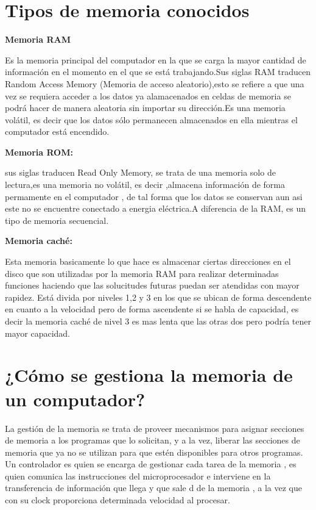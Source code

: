 \documentclass{article}
\begin{document}
\section{Tipos de memoria conocidos} \label{contenido}
\textbf{Memoria RAM}

Es la memoria principal del computador en la que se carga la mayor cantidad de información en el momento en el que se está trabajando.Sus siglas RAM traducen Random Access
Memory (Memoria de acceso aleatorio),esto se refiere a que una vez se requiera acceder a los datos ya alamacenados en celdas de memoria se podrá hacer de manera aleatoria 
sin importar su dirección.Es una memoria volátil, es decir que los datos sólo permanecen almacenados en ella mientras el computador está encendido.


\textbf{Memoria ROM:}

sus siglas traducen Read Only Memory, se trata de una memoria solo de lectura,es una memoria no volátil, es decir ,almacena información de forma permamente en el
computador , de tal forma que los datos se conservan aun asi este no se encuentre conectado a energia eléctrica.A diferencia de la RAM, es un tipo de memoria secuencial.  

\textbf{Memoria caché:}

Esta memoria basicamente lo que hace es almacenar ciertas direcciones en el disco que son utilizadas por la memoria RAM para realizar determinadas funciones haciendo que las solucitudes futuras puedan ser atendidas con mayor rapidez. Está divida por niveles 1,2 y 3 en los que se ubican de forma descendente en cuanto a la velocidad pero de forma ascendente si se habla de capacidad, es decir la memoria caché de nivel 3 es mas lenta que las otras dos pero podría tener mayor capacidad.

\section{¿Cómo se gestiona la memoria de un computador?} \label{contenido}
La gestión de la memoria se trata de proveer mecanismos para asignar secciones de memoria a los programas que lo solicitan,  y a la vez, liberar las secciones de memoria
que ya no se utilizan para que estén disponibles para otros programas. Un controlador es quien se encarga de gestionar cada tarea de la memoria , es quien comunica las instrucciones del microprocesador e interviene en la transferencia de información que llega y que sale d
de la memoria , a la vez que con su clock proporciona determinada velocidad al procesar.
\end{document}

